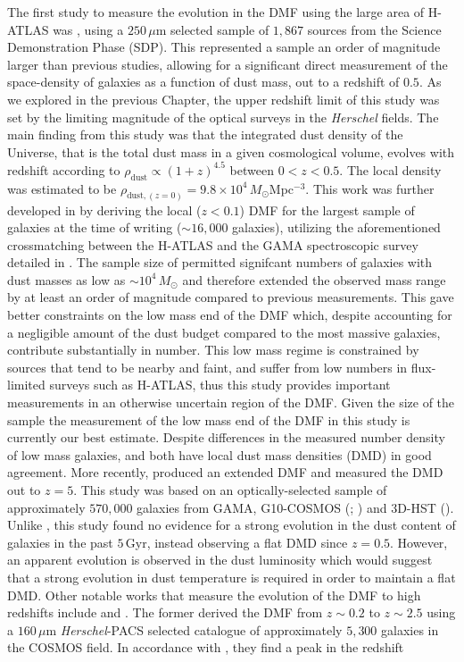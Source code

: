 The first study to measure the evolution in the DMF using the large area of H-ATLAS was \citealt{Dunne_2011}, using a $250\,\mu$m selected sample of $1,867$ sources from the Science Demonstration Phase (SDP). This represented a sample an order of magnitude larger than previous studies, allowing for a significant direct measurement of the space-density of galaxies as a function of dust mass, out to a redshift of $0.5$. As we explored in the previous Chapter, the upper redshift limit of this study was set by the limiting magnitude of the optical surveys in the \textit{Herschel} fields. The main finding from this study was that the integrated dust density of the Universe, that is the total dust mass in a given cosmological volume, evolves with redshift according to $\rho_{\textrm{dust}} \propto (1+z)^{4.5}$ between $0 < z < 0.5$. The local density was estimated to be $\rho_{\textrm{dust}, (z=0)} = 9.8\times10^4$\,$M_\odot$Mpc$^{-3}$. This work was further developed in \citealt{Beeston_2018} by deriving the local ($z < 0.1$) DMF for the largest sample of galaxies at the time of writing ($\sim 16,000$ galaxies), utilizing the aforementioned crossmatching between the H-ATLAS and the GAMA spectroscopic survey detailed in \citealt{Bourne_2016}. The sample size of \citealt{Beeston_2018} permitted signifcant numbers of galaxies with dust masses as low as $\sim 10^4\,M_\odot$ and therefore extended the observed mass range by at least an order of magnitude compared to previous measurements. This gave better constraints on the low mass end of the DMF which, despite accounting for a negligible amount of the dust budget compared to the most massive galaxies, contribute substantially in number. This low mass regime is constrained by sources that tend to be nearby and faint, and suffer from low numbers in flux-limited surveys such as H-ATLAS, thus this study provides important measurements in an otherwise uncertain region of the DMF. Given the size of the \citealt{Beeston_2018} sample the measurement of the low mass end of the DMF in this study is currently our best estimate. Despite differences in the measured number density of low mass galaxies, \citealt{Dunne_2011} and \citealt{Beeston_2018} both have local dust mass densities (DMD) in good agreement. More recently, \citealt{Driver_2018} produced an extended DMF and measured the DMD out to $z = 5$. This study was based on an optically-selected sample of approximately $570,000$ galaxies from GAMA, G10-COSMOS (\citealt{Davies_2015}; \citealt{Andrews_2017}) and 3D-HST (\citealt{Brammer_2012, Momcheva_2016}). Unlike \citealt{Dunne_2011}, this study found no evidence for a strong evolution in the dust content of galaxies in the past $5\,$Gyr, instead observing a flat DMD since $z = 0.5$. However, an apparent evolution is observed in the dust luminosity which would suggest that a strong evolution in dust temperature is required in order to maintain a flat DMD. Other notable works that measure the evolution of the DMF to high redshifts include \citealt{Pozzi_2020} and \citealt{Dudzeviciute_2021}. The former derived the DMF from $z \sim 0.2$ to $z \sim 2.5$ using a $160\,\mu$m \textit{Herschel}-PACS selected catalogue of approximately $5,300$ galaxies in the COSMOS field. In accordance with \citealt{Driver_2018}, they find a peak in the redshift 